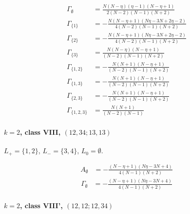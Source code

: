 \documentclass[11pt]{article}
\begin{document}
\begin{align*}
  \Gamma_{\emptyset} &= \frac{N \left(N - \eta\right) \left(\eta - 1\right) \left(N - \eta + 1\right)}{2 \left(N - 2\right) \left(N - 1\right) \left(N + 2\right)} \\
  \Gamma_{\{1\}} &= - \frac{N \left(N - \eta + 1\right) \left(N \eta - 3 N + 2 \eta - 2\right)}{4 \left(N - 2\right) \left(N - 1\right) \left(N + 2\right)} \\
  \Gamma_{\{2\}} &= - \frac{N \left(N - \eta + 1\right) \left(N \eta - 3 N + 2 \eta - 2\right)}{4 \left(N - 2\right) \left(N - 1\right) \left(N + 2\right)} \\
  \Gamma_{\{3\}} &= \frac{N \left(N - \eta\right) \left(N - \eta + 1\right)}{\left(N - 2\right) \left(N - 1\right) \left(N + 2\right)} \\
  \Gamma_{\{1,2\}} &= - \frac{N \left(N + 1\right) \left(N - \eta + 1\right)}{\left(N - 2\right) \left(N - 1\right) \left(N + 2\right)} \\
  \Gamma_{\{1,3\}} &= - \frac{N \left(N + 1\right) \left(N - \eta + 1\right)}{\left(N - 2\right) \left(N - 1\right) \left(N + 2\right)} \\
  \Gamma_{\{2,3\}} &= - \frac{N \left(N + 1\right) \left(N - \eta + 1\right)}{\left(N - 2\right) \left(N - 1\right) \left(N + 2\right)} \\
  \Gamma_{\{1,2,3\}} &= \frac{N \left(N + 1\right)}{\left(N - 2\right) \left(N - 1\right)} 
\end{align*}

\paragraph{$k=2$, class VIII, $(12,34;13,13)$}

$L_+=\{1,2\}$, $L_-=\{3,4\}$, $L_0=\emptyset$.

\begin{align*}
  A_{\emptyset} &= - \frac{\left(N - \eta + 1\right) \left(N \eta - 3 N + 4\right)}{4 \left(N - 1\right) \left(N + 2\right)} 
\end{align*}
\begin{align*}
  \Gamma_{\emptyset} &= - \frac{\left(N - \eta + 1\right) \left(N \eta - 3 N + 4\right)}{4 \left(N - 1\right) \left(N + 2\right)} 
\end{align*}

\paragraph{$k=2$, class VIII', $(12,12;12,34)$}
\end{document}
